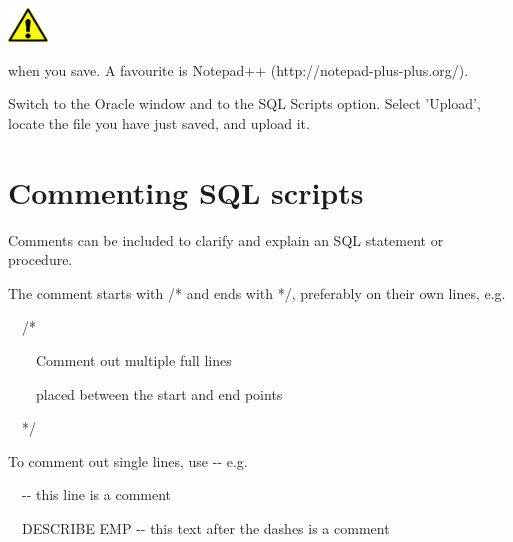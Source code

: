 \begin{center}
  
\includegraphics[width=1.06cm,height=0.903cm]{images/img (2).png}

\end{center}
 when you save. A favourite is Notepad++ (http://notepad-plus-plus.org/).

Switch to the Oracle window and to the SQL Scripts option. Select 'Upload', locate the file you have just saved, and upload it.

\section{Commenting SQL scripts}
Comments can be included to clarify and explain an SQL statement or procedure. 

The comment starts with /* and ends with */, preferably on their own lines, e.g.

\ \ /*

 \ \ \ \ Comment out multiple full lines

\ \ \ \ placed between the start and end points 

\ \ */

To comment out single lines, use -{}- e.g.

\ \ {}-{}-  this line is a comment

\ \ DESCRIBE EMP -{}- this text after the dashes is a comment

\clearpage
